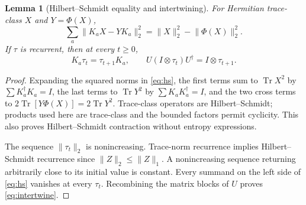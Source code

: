 \documentclass[11pt]{article}
\newtheorem{lemma}[theorem]{Lemma}
\theoremstyle{definition}\newtheorem{definition}[theorem]{Definition}
\newcommand{\Tr}{\operatorname{Tr}}
\newcommand{\norm}[1]{\lVert #1\rVert}
\begin{document}
\begin{lemma}[Hilbert--Schmidt equality and intertwining]\label{lem:hs}
For Hermitian trace-class $X$ and $Y=\Phi(X)$,
\begin{equation}
 \sum_a\norm{K_aX-YK_a}_2^2=\norm X_2^2-\norm{\Phi(X)}_2^2.\label{eq:hs}
\end{equation}
If $\tau$ is recurrent, then at every $t\ge0$,
\begin{equation}
 K_a\tau_t=\tau_{t+1}K_a,\qquad
 U(I\otimes\tau_t)U^\dagger=I\otimes\tau_{t+1}.\label{eq:intertwine}
\end{equation}
\end{lemma}
\begin{proof}
Expanding the squared norms in \eqref{eq:hs}, the first terms sum to $\Tr X^2$ by $\sum K_a^\dagger K_a=I$, the last terms to $\Tr Y^2$ by $\sum K_aK_a^\dagger=I$, and the two cross terms to $2\Tr[Y\Phi(X)]=2\Tr Y^2$. Trace-class operators are Hilbert--Schmidt; products used here are trace-class and the bounded factors permit cyclicity. This also proves Hilbert--Schmidt contraction without entropy expressions.

The sequence $\norm{\tau_t}_2$ is nonincreasing. Trace-norm recurrence implies Hilbert--Schmidt recurrence since $\norm{Z}_2\le\norm{Z}_1$. A nonincreasing sequence returning arbitrarily close to its initial value is constant. Every summand on the left side of \eqref{eq:hs} vanishes at every $\tau_t$. Recombining the matrix blocks of $U$ proves \eqref{eq:intertwine}.
\end{proof}
\end{document}
